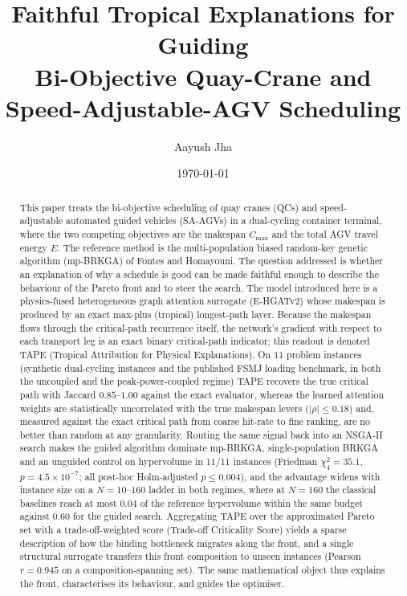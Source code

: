 \documentclass[11pt]{article}
\title{\textbf{Faithful Tropical Explanations for Guiding\\[2pt]
Bi-Objective Quay-Crane and Speed-Adjustable-AGV Scheduling}}
\author{Aayush Jha}
\date{\today}
\newcommand{\Cmax}{C_{\max}}
\begin{document}
\maketitle

\begin{abstract}
\noindent
This paper treats the bi-objective scheduling of quay cranes (QCs) and speed-adjustable
automated guided vehicles (SA-AGVs) in a dual-cycling container terminal, where the two
competing objectives are the makespan $\Cmax$ and the total AGV travel energy $E$. The
reference method is the multi-population biased random-key genetic algorithm (mp-BRKGA)
of Fontes and Homayouni. The question addressed is whether an explanation of why a
schedule is good can be made faithful enough to describe the behaviour of the Pareto
front and to steer the search.
The model introduced here is a physics-fused heterogeneous graph attention surrogate
(E-HGATv2) whose makespan is produced by an exact max-plus (tropical) longest-path layer.
Because the makespan flows through the critical-path recurrence itself, the network's
gradient with respect to each transport leg is an exact binary critical-path indicator;
this readout is denoted TAPE (Tropical Attribution for Physical Explanations). On $11$
problem instances (synthetic dual-cycling instances and the published FSMJ loading
benchmark, in both the uncoupled and the peak-power-coupled regime) TAPE recovers the
true critical path with Jaccard $0.85$--$1.00$ against the exact evaluator, whereas the
learned attention weights are statistically uncorrelated with the true makespan levers
($|\rho|\le 0.18$) and, measured against the exact critical path from coarse hit-rate to
fine ranking, are no better than random at any granularity. Routing the same signal back
into an NSGA-II search makes the guided algorithm dominate mp-BRKGA, single-population
BRKGA and an unguided control on hypervolume in $11/11$ instances (Friedman
$\chi^2_4=35.1$, $p=4.5\times10^{-7}$; all post-hoc Holm-adjusted $p\le0.004$), and the
advantage widens with instance size on a $N{=}10$--$160$ ladder in both regimes, where at
$N{=}160$ the classical baselines reach at most $0.04$ of the reference hypervolume within
the same budget against $0.60$ for the guided search.
Aggregating TAPE over the approximated Pareto set with a trade-off-weighted score
(Trade-off Criticality Score) yields a sparse description of how the binding bottleneck
migrates along the front, and a single structural surrogate transfers this front
composition to unseen instances (Pearson $r=0.945$ on a composition-spanning set). The
same mathematical object thus explains the front, characterises its behaviour, and guides
the optimiser.
\end{abstract}
\end{document}
